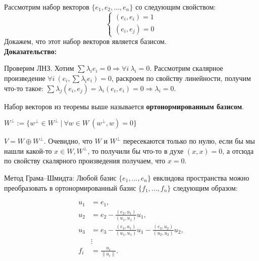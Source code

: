 \documentclass[12pt]{article}
\begin{document}
\begin{theorembox}
    Рассмотрим набор векторов $\{e_1, e_2, \dots,e_n\}$ со следующим свойством:
    \[
        \begin{cases}
        (e_i, e_i) = 1\\
        (e_i, e_j) = 0
        \end{cases}
    \]
    Докажем, что этот набор векторов является базисом.\\

    \textbf{Доказательство:}

    Проверим ЛНЗ. Хотим $\sum \lambda_i e_i = 0 \Rightarrow \forall i \ \lambda_i = 0$. Рассмотрим скалярное произведение $\forall i \ (e_i, \sum \lambda_i e_i) =0 $, раскроем по свойству линейности, получим что-то такое: $\sum \lambda_j (e_i, e_j) = \lambda_i (e_i, e_i) = 0 \Rightarrow \lambda_i = 0$.
    
\end{theorembox}

\begin{definitionbox}
    Набор векторов из теоремы выше называется \textbf{ортонормированным базисом}.
\end{definitionbox}

\begin{definitionbox}
    $W^\perp := \{w^\perp \in W^\perp \ | \ \forall w \in W \ (w^\perp, w) = 0\}$
\end{definitionbox}

\begin{remarkbox}
    $V = W \oplus W^\perp$. Очевидно, что $W$ и $W^\perp$ пересекаются только по нулю, если бы мы нашли какой-то $x \in W, W^\perp$, то получили бы что-то в духе $(x, x) = 0$, а отсюда по свойству скалярного произведения получаем, что $x = 0$.
\end{remarkbox}

\begin{theorembox}
    Метод Грама–Шмидта: Любой базис $ \{e_1, ..., e_n\} $ евклидова пространства можно преобразовать в ортонормированный базис $ \{f_1, ..., f_n\} $ следующим образом:

    \begin{align*}
    u_1 &= e_1, \\
    u_2 &= e_2 - \frac{(e_2, u_1)}{(u_1, u_1)} u_1, \\
    u_3 &= e_3 - \frac{(e_3, u_1)}{(u_1, u_1)} u_1 - \frac{(e_3, u_2)}{(u_2, u_2)} u_2, \\
    &\vdots \\
    f_i &= \frac{u_i}{\|u_i\|}.
    \end{align*}
\end{theorembox}
\end{document}
